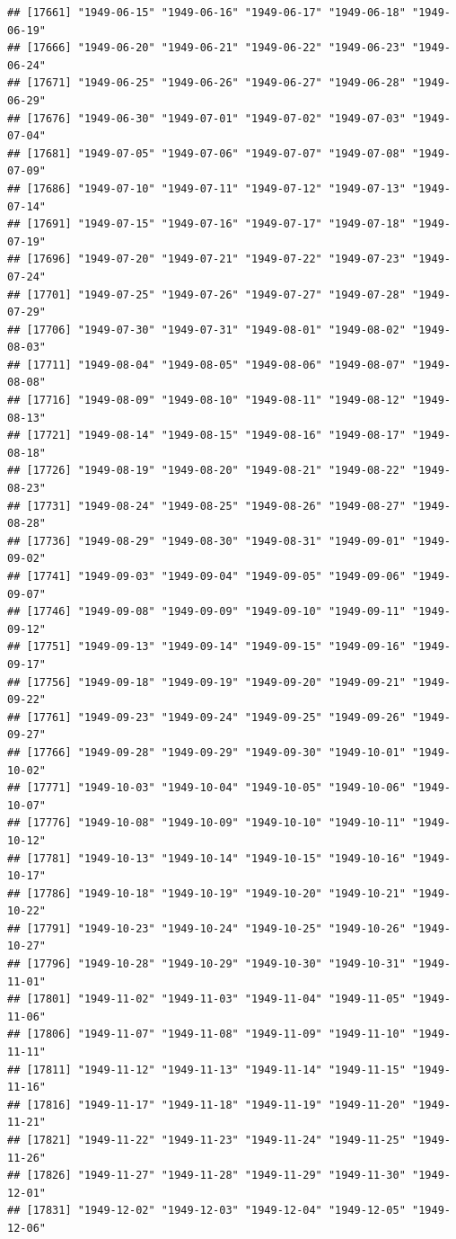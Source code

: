 \documentclass{article}\usepackage[]{graphicx}\usepackage[]{color}
\makeatletter
\newenvironment{kframe}{%
 \def\at@end@of@kframe{}%
 \ifinner\ifhmode%
  \def\at@end@of@kframe{\end{minipage}}%
  \begin{minipage}{\columnwidth}%
 \fi\fi%
 \def\FrameCommand##1{\hskip\@totalleftmargin \hskip-\fboxsep
 \colorbox{shadecolor}{##1}\hskip-\fboxsep
     \hskip-\linewidth \hskip-\@totalleftmargin \hskip\columnwidth}%
 \MakeFramed {\advance\hsize-\width
   \@totalleftmargin\z@ \linewidth\hsize
   \@setminipage}}%
 {\par\unskip\endMakeFramed%
 \at@end@of@kframe}
\newenvironment{knitrout}{}{} %
\makeatother
\begin{document}
\begin{description}
\begin{knitrout}
\begin{kframe}
\begin{verbatim}
## [17661] "1949-06-15" "1949-06-16" "1949-06-17" "1949-06-18" "1949-06-19"
## [17666] "1949-06-20" "1949-06-21" "1949-06-22" "1949-06-23" "1949-06-24"
## [17671] "1949-06-25" "1949-06-26" "1949-06-27" "1949-06-28" "1949-06-29"
## [17676] "1949-06-30" "1949-07-01" "1949-07-02" "1949-07-03" "1949-07-04"
## [17681] "1949-07-05" "1949-07-06" "1949-07-07" "1949-07-08" "1949-07-09"
## [17686] "1949-07-10" "1949-07-11" "1949-07-12" "1949-07-13" "1949-07-14"
## [17691] "1949-07-15" "1949-07-16" "1949-07-17" "1949-07-18" "1949-07-19"
## [17696] "1949-07-20" "1949-07-21" "1949-07-22" "1949-07-23" "1949-07-24"
## [17701] "1949-07-25" "1949-07-26" "1949-07-27" "1949-07-28" "1949-07-29"
## [17706] "1949-07-30" "1949-07-31" "1949-08-01" "1949-08-02" "1949-08-03"
## [17711] "1949-08-04" "1949-08-05" "1949-08-06" "1949-08-07" "1949-08-08"
## [17716] "1949-08-09" "1949-08-10" "1949-08-11" "1949-08-12" "1949-08-13"
## [17721] "1949-08-14" "1949-08-15" "1949-08-16" "1949-08-17" "1949-08-18"
## [17726] "1949-08-19" "1949-08-20" "1949-08-21" "1949-08-22" "1949-08-23"
## [17731] "1949-08-24" "1949-08-25" "1949-08-26" "1949-08-27" "1949-08-28"
## [17736] "1949-08-29" "1949-08-30" "1949-08-31" "1949-09-01" "1949-09-02"
## [17741] "1949-09-03" "1949-09-04" "1949-09-05" "1949-09-06" "1949-09-07"
## [17746] "1949-09-08" "1949-09-09" "1949-09-10" "1949-09-11" "1949-09-12"
## [17751] "1949-09-13" "1949-09-14" "1949-09-15" "1949-09-16" "1949-09-17"
## [17756] "1949-09-18" "1949-09-19" "1949-09-20" "1949-09-21" "1949-09-22"
## [17761] "1949-09-23" "1949-09-24" "1949-09-25" "1949-09-26" "1949-09-27"
## [17766] "1949-09-28" "1949-09-29" "1949-09-30" "1949-10-01" "1949-10-02"
## [17771] "1949-10-03" "1949-10-04" "1949-10-05" "1949-10-06" "1949-10-07"
## [17776] "1949-10-08" "1949-10-09" "1949-10-10" "1949-10-11" "1949-10-12"
## [17781] "1949-10-13" "1949-10-14" "1949-10-15" "1949-10-16" "1949-10-17"
## [17786] "1949-10-18" "1949-10-19" "1949-10-20" "1949-10-21" "1949-10-22"
## [17791] "1949-10-23" "1949-10-24" "1949-10-25" "1949-10-26" "1949-10-27"
## [17796] "1949-10-28" "1949-10-29" "1949-10-30" "1949-10-31" "1949-11-01"
## [17801] "1949-11-02" "1949-11-03" "1949-11-04" "1949-11-05" "1949-11-06"
## [17806] "1949-11-07" "1949-11-08" "1949-11-09" "1949-11-10" "1949-11-11"
## [17811] "1949-11-12" "1949-11-13" "1949-11-14" "1949-11-15" "1949-11-16"
## [17816] "1949-11-17" "1949-11-18" "1949-11-19" "1949-11-20" "1949-11-21"
## [17821] "1949-11-22" "1949-11-23" "1949-11-24" "1949-11-25" "1949-11-26"
## [17826] "1949-11-27" "1949-11-28" "1949-11-29" "1949-11-30" "1949-12-01"
## [17831] "1949-12-02" "1949-12-03" "1949-12-04" "1949-12-05" "1949-12-06"

\end{verbatim}
\end{kframe}
\end{knitrout}
\end{description}
\end{document}

